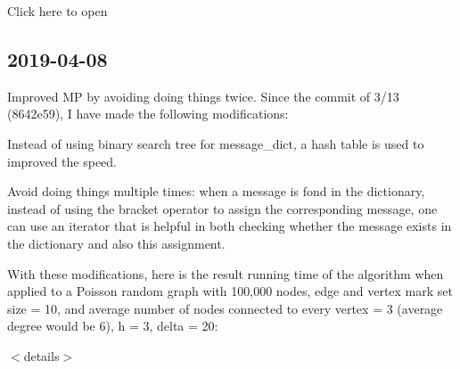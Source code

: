 Click here to open 

\subsection*{2019-\/04-\/08}

Improved MP by avoiding doing things twice. Since the commit of 3/13 (8642e59), I have made the following modifications\+:


\begin{DoxyEnumerate}
\item Instead of using binary search tree for {\ttfamily message\+\_\+dict}, a hash table is used to improved the speed.
\item Avoid doing things multiple times\+: when a message is fond in the dictionary, instead of using the bracket operator to assign the corresponding message, one can use an iterator that is helpful in both checking whether the message exists in the dictionary and also this assignment.
\end{DoxyEnumerate}

With these modifications, here is the result running time of the algorithm when applied to a Poisson random graph with 100,000 nodes, edge and vertex mark set size = 10, and average number of nodes connected to every vertex = 3 (average degree would be 6), h = 3, delta = 20\+:

$<$details$>$

